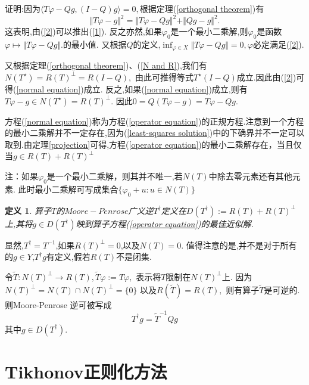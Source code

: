 \documentclass[UTF8]{ctexart}
\numberwithin{equation}{section}
\newtheorem{definition}{\hspace{2em}定义}[section]
\begin{document}
证明:因为$\langle T\varphi -Qg,(I-Q)g\rangle =0,$根据定理(\ref{orthogonal theorem})有
\begin{equation}
\Vert T\varphi -g\Vert ^{2}=\Vert T\varphi -Qg\Vert ^{2}+\Vert Qg -g\Vert ^{2}.
\end{equation}
这表明,由(\ref{2})可以推出(\ref{1}).
反之亦然,如果$\varphi_{0}$是一个最小二乘解,则$\varphi _{0}$是函数$\varphi \mapsto \Vert T\varphi -Qg\Vert.$的最小值.
又根据$Q$的定义,$\inf_{\varphi \in X} \Vert T\varphi -Qg\Vert =0,\varphi$必定满足(\ref{2}).

又根据定理(\ref{orthogonal theorem})、(\ref{N and R}),我们有$N(T^{\star})=R(T)^{\bot}=R(I-Q),$
由此可推得等式$T^{\star}(I-Q)$成立.因此由(\ref{2})可得(\ref{normal equation})成立.
反之,如果(\ref{normal equation})成立,则有$T\varphi -g\in N(T^{\star})=R(T)^{\bot}.$
因此$0=Q(T\varphi -g)=T\varphi -Qg.$

方程(\ref{normal equation})称为方程(\ref{operator equation})的正规方程.注意到一个方程的最小二乘解并不一定存在,因为(\ref{least-squares solution})中的下确界并不一定可以取到.由定理\ref{projection}可得,方程(\ref{operator equation})的最小二乘解存在，当且仅当$g\in R(T)+R(T)^{\perp}$

注：如果$\varphi_{0}$是一个最小二乘解，则其并不唯一,若$N(T)$中除去零元素还有其他元素.
此时最小二乘解可写成集合$\{ \varphi_{0}+u:u\in N(T)\}$

\begin{definition}
算子$T$的$Moore-Penrose$广义逆$T^{\dag}$定义在$D(T^{\dag}):=R(T)+R(T)^{\perp}$上,其将$g\in D(T^{\dag})$映到算子方程(\ref{operator equation})的最佳近似解.
\end{definition}

显然,$T^{\dag}=T^{-1}$,如果$R(T)^{\perp}=0$,以及$N(T)=0$.
值得注意的是,并不是对于所有的$g\in Y$,$T^{\dag}g$有定义,假若$R(T)$不是闭集.

令$\widetilde{T}:N(T)^{\perp}\to R(T),\widetilde{T}\varphi :=T\varphi ,$
表示将$T$限制在$N(T)^{\perp}$上.
因为$N(T)^{\perp}=N(T)\cap N(T)^{\perp}=\{ 0\}$
以及$R(\widetilde{T})=R(T),$
则有算子$\widetilde{T}$是可逆的.
则Moore-Penrose 逆可被写成
\begin{equation}
T^{\dag}g=\widetilde{T}^{-1}Qg  
\end{equation}
其中$g\in D(T^{\dag}).$

























\newpage
\section{Tikhonov正则化方法}
\end{document}
